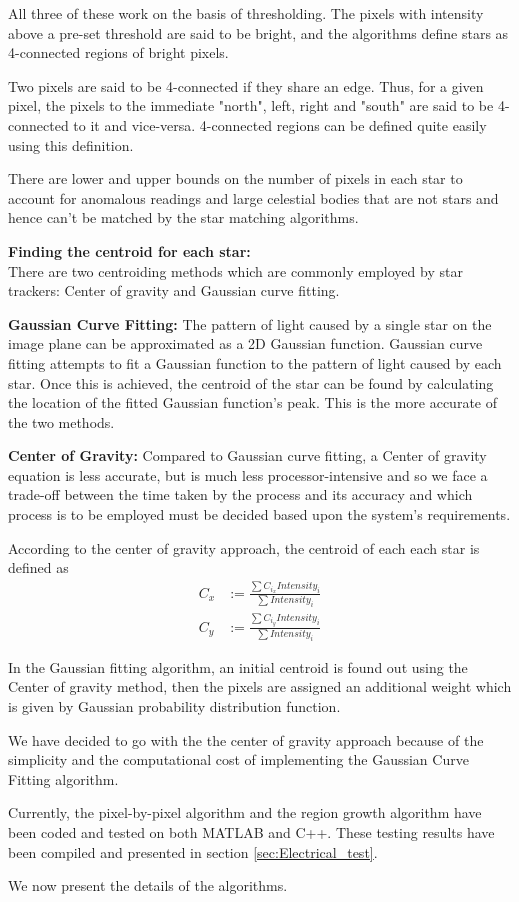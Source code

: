 All three of these work on the basis of thresholding. The pixels with intensity above a pre-set threshold are said to be bright, and the algorithms define stars as 4-connected regions of bright pixels. 

Two pixels are said to be 4-connected if they share an edge. Thus, for a given pixel, the pixels to the immediate "north", left, right and "south" are said to be 4-connected to it and vice-versa. 4-connected regions can be defined quite easily using this definition.

There are lower and upper bounds on the number of pixels in each star to account for anomalous readings and large celestial bodies that are not stars and hence can't be matched by the star matching algorithms.

\large{\textbf{Finding the centroid for each star:}}\\
\normalsize
There are two centroiding methods which are commonly employed by star trackers:
Center of gravity and Gaussian curve fitting.

\textbf{Gaussian Curve Fitting:}
The pattern of light caused by a single star on the image plane can be approximated as a 2D Gaussian function. Gaussian curve fitting attempts to fit a Gaussian function to the pattern of light caused by each star. Once this is achieved, the centroid of the star can be found by calculating the location of the fitted Gaussian function's peak. This is the more accurate of the two methods.

\textbf{Center of Gravity:}
Compared to Gaussian curve fitting, a Center of gravity equation is less accurate, but is much less processor-intensive and so we face a trade-off between the time taken by the process and its accuracy and which process is to be employed must be decided based upon the system's requirements.

According to the center of gravity approach, the centroid of each each star is defined as
\begin{align}
    C_{x} & := \frac{\sum C_{i_{x}}Intensity_{i}}{\sum Intensity_{i}}\\
    C_{y} & := \frac{\sum C_{i_{y}}Intensity_{i}}{\sum Intensity_{i}}
\end{align}

In the Gaussian fitting algorithm, an initial centroid is found out using the Center of gravity method, then the pixels are assigned an additional weight which is given by Gaussian probability distribution function.

We have decided to go with the the center of gravity approach because of the simplicity and the computational cost of implementing the Gaussian Curve Fitting algorithm.

Currently, the pixel-by-pixel algorithm and the region growth algorithm have been coded and tested on both MATLAB and C++. These testing results have been compiled and presented in section \ref{sec:Electrical_test}.

We now present the details of the algorithms.


